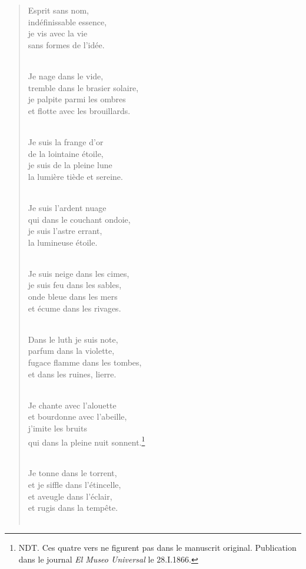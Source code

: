 \documentclass[a4paper,11pt]{book}
\begin{document}
\begin{verse}
Esprit sans nom, \\
indéfinissable essence, \\
je vis avec la vie \\
sans formes de l'idée. \\ \

Je nage dans le vide, \\
tremble dans le brasier solaire, \\
je palpite parmi les ombres \\
et flotte avec les brouillards. \\ \

Je suis la frange d'or \\
de la lointaine étoile, \\
je suis de la pleine lune \\
la lumière tiède et sereine. \\ \

Je suis l'ardent nuage \\
qui dans le couchant ondoie, \\
je suis l'astre errant, \\
la lumineuse étoile. \\ \

Je suis neige dans les cimes, \\
je suis feu dans les sables, \\
onde bleue dans les mers \\
et écume dans les rivages. \\ \

Dans le luth je suis note, \\
parfum dans la violette, \\
fugace flamme dans les tombes, \\
et dans les ruines, lierre. \\ \

Je chante avec l'alouette \\
et bourdonne avec l'abeille, \\
j'imite les bruits \\
qui dans la pleine nuit sonnent.\footnote{NDT. Ces quatre vers ne figurent pas dans le manuscrit original. Publication dans le journal {\em El Museo Universal} le 28.I.1866.} \\ \

\newpage

Je tonne dans le torrent, \\
et je siffle dans l'étincelle, \\
et aveugle dans l'éclair, \\
et rugis dans la tempête. \\ \


\end{verse}
\end{document}
